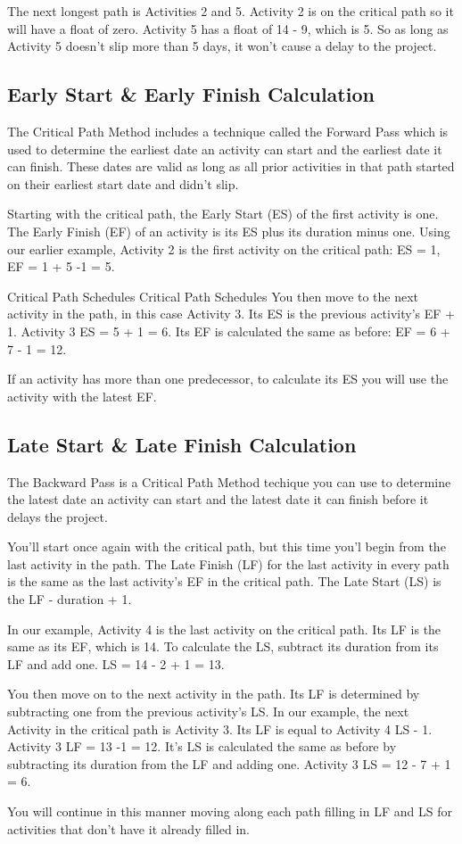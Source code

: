 The next longest path is Activities 2 and 5. Activity 2 is on the critical path so it will have a float of zero. Activity 5 has a float of 14 - 9, which is 5. So as long as Activity 5 doesn't slip more than 5 days, it won't cause a delay to the project.

\subsection{Early Start & Early Finish Calculation}

The Critical Path Method includes a technique called the Forward Pass which is used to determine the earliest date an activity can start and the earliest date it can finish. These dates are valid as long as all prior activities in that path started on their earliest start date and didn't slip.

Starting with the critical path, the Early Start (ES) of the first activity is one. The Early Finish (EF) of an activity is its ES plus its duration minus one. Using our earlier example, Activity 2 is the first activity on the critical path: ES = 1, EF = 1 + 5 -1 = 5.

Critical Path Schedules
Critical Path Schedules
You then move to the next activity in the path, in this case Activity 3. Its ES is the previous activity's EF + 1. Activity 3 ES = 5 + 1 = 6. Its EF is calculated the same as before: EF = 6 + 7 - 1 = 12.

If an activity has more than one predecessor, to calculate its ES you will use the activity with the latest EF.

\subsection{Late Start & Late Finish Calculation}

The Backward Pass is a Critical Path Method techique you can use to determine the latest date an activity can start and the latest date it can finish before it delays the project.

You'll start once again with the critical path, but this time you'l begin from the last activity in the path. The Late Finish (LF) for the last activity in every path is the same as the last activity's EF in the critical path. The Late Start (LS) is the LF - duration + 1.

In our example, Activity 4 is the last activity on the critical path. Its LF is the same as its EF, which is 14. To calculate the LS, subtract its duration from its LF and add one. LS = 14 - 2 + 1 = 13.

You then move on to the next activity in the path. Its LF is determined by subtracting one from the previous activity's LS. In our example, the next Activity in the critical path is Activity 3. Its LF is equal to Activity 4 LS - 1. Activity 3 LF = 13 -1 = 12. It's LS is calculated the same as before by subtracting its duration from the LF and adding one. Activity 3 LS = 12 - 7 + 1 = 6.

You will continue in this manner moving along each path filling in LF and LS for activities that don't have it already filled in.
